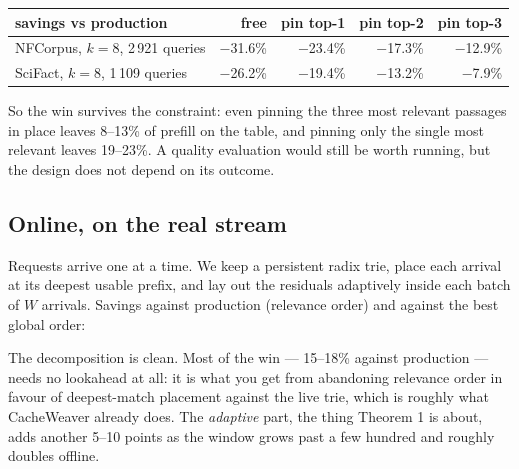 \documentclass[11pt]{article}
\theoremstyle{plain}
\begin{document}
\begin{center}\small
\begin{tabular}{lrrrr}\toprule
savings vs production & free & pin top-1 & pin top-2 & pin top-3 \\ \midrule
NFCorpus, $k=8$, 2\,921 queries & $-$31.6\% & $-$23.4\% & $-$17.3\% & $-$12.9\% \\
SciFact, $k=8$, 1\,109 queries & $-$26.2\% & $-$19.4\% & $-$13.2\% & $-$7.9\% \\
\bottomrule\end{tabular}\end{center}

So the win survives the constraint: even pinning the three most relevant passages in place leaves 8--13\% of prefill on the table, and pinning only the single most relevant leaves 19--23\%. A quality evaluation would still be worth running, but the design does not depend on its outcome.

\subsection{Online, on the real stream}

Requests arrive one at a time. We keep a persistent radix trie, place each arrival at its deepest usable prefix, and lay out the residuals adaptively inside each batch of $W$ arrivals. Savings against production (relevance order) and against the best global order:

\begin{center}\small
{}\end{center}

The decomposition is clean. Most of the win --- 15--18\% against production --- needs no lookahead at all: it is what you get from abandoning relevance order in favour of deepest-match placement against the live trie, which is roughly what CacheWeaver already does. The \emph{adaptive} part, the thing Theorem 1 is about, adds another 5--10 points as the window grows past a few hundred and roughly doubles offline.
\end{document}
